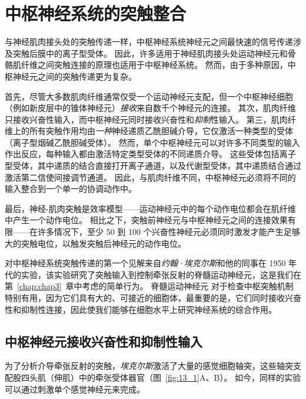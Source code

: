 \chapter{中枢神经系统的突触整合} \label{chap:chap13}

与神经肌肉接头处的突触传递一样，中枢神经系统神经元之间最快速的信号传递涉及突触后膜中的离子型受体。
因此，许多适用于神经肌肉接头处运动神经元和骨骼肌纤维之间突触连接的原理也适用于中枢神经系统。
然而，由于多种原因，中枢神经元之间的突触传递更为复杂。


首先，尽管大多数肌肉纤维通常仅受一个运动神经元支配，但一个中枢神经细胞（例如新皮层中的锥体神经元）\textit{接收}来自数千个神经元的连接。
其次，肌肉纤维只接收兴奋性输入，而中枢神经元同时接收兴奋性和\textit{抑制}性输入。
第三，肌肉纤维上的所有突触作用均由\textit{一种}神经递质乙酰胆碱介导，它仅激活一种类型的受体（离子型烟碱乙酰胆碱受体）。
然而，单个中枢神经元可以对许多不同类型的输入作出反应，每种输入都由激活特定类型受体的不同递质介导。 
这些受体包括离子型受体，其中递质的结合直接打开离子通道，以及代谢型受体，其中递质结合通过激活第二信使间接调节通道。
因此，与肌肉纤维不同，中枢神经元必须将不同的输入整合到一个单一的协调动作中。


最后，神经-肌肉突触是效率模型——运动神经元中的每个动作电位都会在肌纤维中产生一个动作电位。
相比之下，突触前神经元与中枢神经元之间的连接效果有限——在许多情况下，至少 50 到 100 个兴奋性神经元必须同时激发才能产生足够大的突触电位，以触发突触后神经元的动作电位。


对中枢神经系统突触传递的第一个见解来自\textit{约翰·埃克尔斯}和他的同事在 1950 年代的实验，该实验研究了突触输入到控制牵张反射的脊髓运动神经元，这是我们在第~\ref{chap:chap3}~章中考虑的简单行为。
脊髓运动神经元 对于检查中枢突触机制特别有用，因为它们具有大的、可接近的细胞体，最重要的是，它们同时接收兴奋性和抑制性连接，因此使我们能够在细胞水平上研究神经系统的综合作用。



\section{中枢神经元接收兴奋性和抑制性输入}

为了分析介导牵张反射的突触，\textit{埃克尔斯}激活了大量的感觉细胞轴突，这些轴突支配股四头肌（伸肌）中的牵张受体器官（图~\ref{fig:13_1}A、B）。 
如今，同样的实验可以通过刺激单个感觉神经元来完成。


